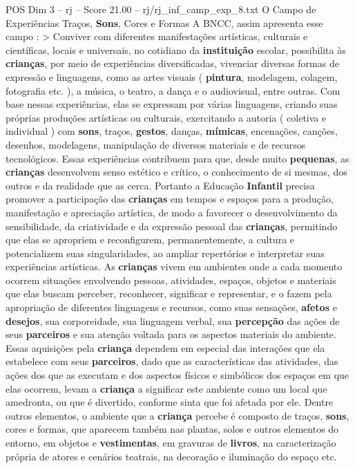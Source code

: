 \begin{textsample}{POS Dim 3 – rj – Score 21.00 – rj/rj\_inf\_camp\_exp\_8.txt}  \label{ex:f3_pos_009}
O Campo de Experiências Traços, \textbf{Sons}, Cores e Formas A BNCC, assim apresenta esse campo : > Conviver com diferentes manifestações artísticas, culturais e científicas, locais e universais, no cotidiano da \textbf{instituição} escolar, possibilita às \textbf{crianças}, por meio de experiências diversificadas, vivenciar diversas formas de expressão e linguagens, como as artes visuais ( \textbf{pintura}, modelagem, colagem, fotografia etc. ), a música, o teatro, a dança e o audiovisual, entre outras.
Com base nessas experiências, elas se expressam por várias linguagens, criando suas próprias produções artísticas ou culturais, exercitando a autoria ( coletiva e individual ) com \textbf{sons}, traços, \textbf{gestos}, danças, \textbf{mímicas}, encenações, canções, desenhos, modelagens, manipulação de diversos materiais e de recursos tecnológicos.
Essas experiências contribuem para que, desde muito \textbf{pequenas}, as \textbf{crianças} desenvolvem senso estético e crítico, o conhecimento de si mesmas, dos outros e da realidade que as cerca.
Portanto a Educação \textbf{Infantil} precisa promover a participação das \textbf{crianças} em tempos e espaços para a produção, manifestação e apreciação artística, de modo a favorecer o desenvolvimento da sensibilidade, da criatividade e da expressão pessoal das \textbf{crianças}, permitindo que elas se apropriem e reconfigurem, permanentemente, a cultura e potencializem suas singularidades, ao ampliar repertórios e interpretar suas experiências artísticas.
As \textbf{crianças} vivem em ambientes onde a cada momento ocorrem situações envolvendo pessoas, atividades, espaços, objetos e materiais que elas buscam perceber, reconhecer, significar e representar, e o fazem pela apropriação de diferentes linguagens e recursos, como suas sensações, \textbf{afetos} e \textbf{desejos}, sua corporeidade, sua linguagem verbal, sua \textbf{percepção} das ações de seus \textbf{parceiros} e sua atenção voltada para os aspectos materiais do ambiente.
Essas aquisições pela \textbf{criança} dependem em especial das interações que ela estabelece com seus \textbf{parceiros}, dado que as características das atividades, das ações dos que as executam e dos aspectos físicos e simbólicos dos espaços em que elas ocorrem, levam a \textbf{criança} a significar este ambiente como um local que amedronta, ou que é divertido, conforme sinta que foi afetada por ele.
Dentre outros elementos, o ambiente que a \textbf{criança} percebe é composto de traços, \textbf{sons}, cores e formas, que aparecem também nas plantas, solos e outros elementos do entorno, em objetos e \textbf{vestimentas}, em gravuras de \textbf{livros}, na caracterização própria de atores e cenários teatrais, na decoração e iluminação do espaço etc.

\end{textsample}
